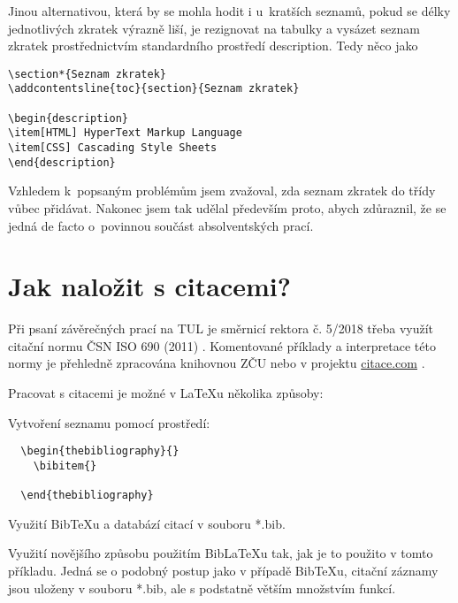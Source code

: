 \documentclass[FM,DP,EN]{tulthesis}
\newcommand{\argument}[1]{{\ttfamily\color{\tulcolor}#1}}
\newenvironment{myquote}{\begin{list}{}{\setlength\leftmargin\parindent}\item[]}{\end{list}}
\newenvironment{listing}{\begin{myquote}\color{\tulcolor}}{\end{myquote}}
\begin{document}
Jinou alternativou, která by se mohla hodit i u~kratších seznamů, pokud se
délky jednotlivých zkratek výrazně liší, je rezignovat na tabulky a vysázet
seznam zkratek prostřednictvím standardního prostředí \argument{description}.
Tedy něco jako

\begin{listing}
\begin{verbatim}
\section*{Seznam zkratek}
\addcontentsline{toc}{section}{Seznam zkratek}

\begin{description}
\item[HTML] HyperText Markup Language
\item[CSS] Cascading Style Sheets
\end{description}
\end{verbatim}
\end{listing}

Vzhledem k~popsaným problémům jsem zvažoval, zda seznam zkratek do třídy vůbec
přidávat. Nakonec jsem tak udělal především proto, abych zdůraznil, že se jedná
de facto o~povinnou součást absolventských prací.

\chapter{Jak naložit s citacemi?}

Při psaní závěrečných prací na TUL je směrnicí rektora č. 5/2018 třeba využít citační normu ČSN ISO 690 (2011) \cite{csniso690}. Komentované příklady a interpretace této normy je přehledně zpracována knihovnou ZČU nebo v projektu \hyperlink{citace.com}{citace.com} \cite{csniso690ZCU,csniso690citaceCOM}.

Pracovat s citacemi je možné v \LaTeX{}u několika způsoby: 
\begin{enumerate}
  \item Vytvoření seznamu pomocí prostředí: 
  \begin{listing}
  \begin{verbatim}
  \begin{thebibliography}{}
    \bibitem{}
   
  \end{thebibliography}
  \end{verbatim}
  \end{listing}
  \item Využití Bib\TeX{}u a databází citací v souboru \argument{*.bib}.
  \item Využití novějšího způsobu použitím Bib\LaTeX{}u tak, jak je to použito v tomto příkladu. Jedná se o podobný postup jako v případě Bib\TeX{}u, citační záznamy jsou uloženy v souboru \argument{*.bib}, ale s podstatně větším množstvím funkcí. 
\end{enumerate}
\end{document}

